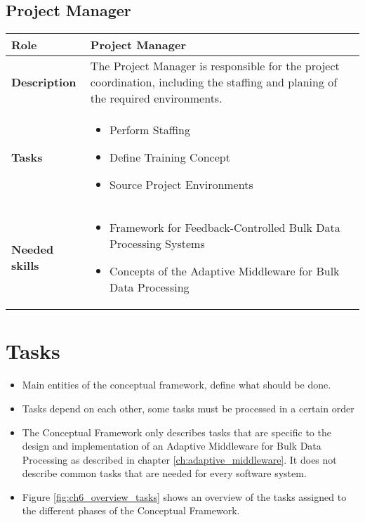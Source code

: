 \subsection{Project Manager}
\begin{minipage}{\textwidth}
 \label{table:ch6_Role_Project_Manager}
\begin{tabular}
	{|m{2cm}|m{10cm}|} \hline \bfseries Role & Project Manager\\
	\hline \bfseries Description & The Project Manager is responsible for the project coordination, including the staffing and planing of the required environments.\\
	\hline \bfseries Tasks & 
	\begin{itemize}
		\item Perform Staffing
		\item Define Training Concept
		\item Source Project Environments
	\end{itemize}
	\\
	\hline 
	\bfseries Needed skills &
	\begin{itemize}
		\item Framework for Feedback-Controlled Bulk Data Processing Systems
		\item Concepts of the Adaptive Middleware for Bulk Data Processing
	\end{itemize}
	\\
	\hline
\end{tabular}
\end{minipage}

\section{Tasks}
\label{sec:ch6_tasks}

\begin{itemize}
	\item Main entities of the conceptual framework, define what should be done.
	\item Tasks depend on each other, some tasks must be processed in a certain order
	\item The Conceptual Framework only describes tasks that are specific to the design and implementation of an Adaptive Middleware for Bulk Data Processing as described in chapter \ref{ch:adaptive_middleware}. It does not describe common tasks that are needed for every software system.
	\item Figure \ref{fig:ch6_overview_tasks} shows an overview of the tasks assigned to the different phases of the Conceptual Framework.
\end{itemize}

